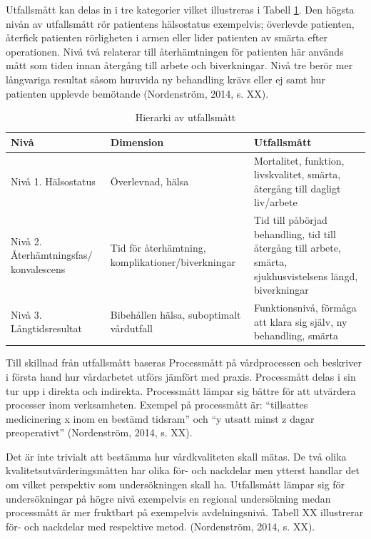 Utfallsmått kan delas in i tre kategorier vilket illustreras i Tabell \ref{utfallsh}. Den högsta nivån av utfallsmått rör patientens hälsostatus exempelvis; överlevde patienten, återfick patienten rörligheten i armen eller lider patienten av smärta efter operationen. Nivå två relaterar till återhämtningen för patienten här används mått som tiden innan återgång till arbete och biverkningar. Nivå tre berör mer långvariga resultat såsom huruvida ny behandling krävs eller ej samt hur patienten upplevde bemötande  (Nordenström, 2014, s. XX).

\begin{table}[h]
\centering
\caption{Hierarki av utfallsmått}
\label{utfallsh}
\begin{tabular}{|p{3cm}|p{3cm}|p{5cm}|}
\hline
Nivå & Dimension & Utfallsmått \\ \hline
Nivå 1. Hälsostatus & Överlevnad, hälsa & Mortalitet, funktion, livskvalitet, smärta, återgång till dagligt liv/arbete \\ \hline
Nivå 2. Återhämtningsfas/ konvalescens & Tid för återhämtning, komplikationer/biverkningar & Tid till påbörjad behandling, tid till återgång till arbete, smärta, sjukhusvistelsens längd, biverkningar \\ \hline
Nivå 3. Långtidsresultat & Bibehållen hälsa, suboptimalt vårdutfall & Funktionsnivå, förmåga att klara sig själv, ny behandling, smärta \\ \hline
\end{tabular}
\end{table}

Till skillnad från utfallsmått baseras Processmått  på vårdprocessen och beskriver i första hand hur vårdarbetet utförs jämfört med praxis. Processmått delas i sin tur upp i direkta och indirekta. Processmått lämpar sig bättre för att utvärdera processer inom verksamheten. Exempel på processmått är: “tillsattes medicinering x inom en bestämd tidsram” och “y utsatt minst z dagar preoperativt” (Nordenström, 2014, s. XX).
 
Det är inte trivialt att bestämma hur vårdkvaliteten skall mätas. De två olika kvalitetsutvärderingsmåtten har olika för- och nackdelar men ytterst handlar det om vilket perspektiv som undersökningen skall ha. Utfallsmått lämpar sig för undersökningar på högre nivå exempelvis en regional undersökning medan processmått är mer fruktbart på exempelvis avdelningsnivå. Tabell XX illustrerar för- och nackdelar med respektive metod. (Nordenström, 2014, s. XX).

